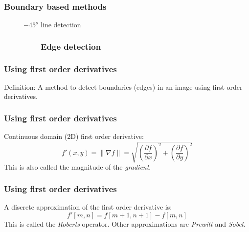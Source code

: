 \begin{frame}
\frametitle{Boundary based methods}
\logoCSIPCPL\mypagenum
	\begin{figure}[!htp]
	    \hspace{0.5cm}
	    \caption{$-45^o$ line detection}
	\end{figure}
\end{frame}


\subsubsection{\ \ \ \ \ \ \ \ Edge detection}
\begin{frame}
\frametitle{Using first order derivatives}
\logoCSIPCPL\mypagenum
	\begin{block}{Definition:}
		A method to detect boundaries (edges) in an image using first order derivatives.
	\end{block}
\end{frame}




\begin{frame}
\frametitle{Using first order derivatives}
\logoCSIPCPL\mypagenum
	Continuous domain (2D) first order derivative:
	\begin{equation}
		\label{eqn:Cont2DFirstOrderDerivative}
		f'(x,y)=\|\nabla f\| = \sqrt{(\frac{\partial f}{\partial x})^2 + (\frac{\partial f}{\partial y})^2}
	\end{equation}
	This is also called the magnitude of the \emph{gradient}.
\end{frame}






\begin{frame}
\frametitle{Using first order derivatives}
\logoCSIPCPL\mypagenum
	A discrete approximation of the first order derivative is:	
	\begin{equation}
		f'[m,n] = f[m+1,n+1] - f[m,n]
		\label{eqn:Discrete2DFirstOrderDerivative}
	\end{equation}	
	This is called the \emph{Roberts} operator.  Other approximations
	are \emph{Prewitt} and \emph{Sobel}.
\end{frame}




